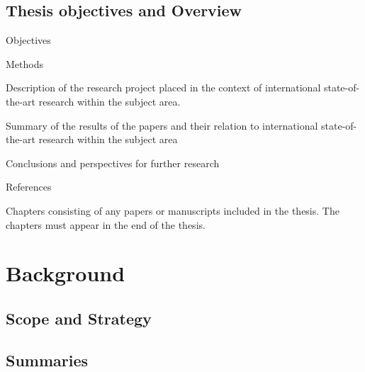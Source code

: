 \section{}
\section{}
\section{}



\chapter{Thesis objectives and Overview}

    \item Objectives
    \item Methods
    \item Description of the research project 
    placed in the context of international state-of-the-art research
    within the subject area.
    \item Summary of the results of the papers 
    and their relation to international state-of-the-art research
    within the subject area
    \item Conclusions and perspectives for further research
    \item References
    \item Chapters consisting of
    any papers or manuscripts included in the thesis. 
    The chapters must appear in the end of the thesis.

 


\part{Background}

\chapter{Scope and Strategy}
\chapter{Summaries}

